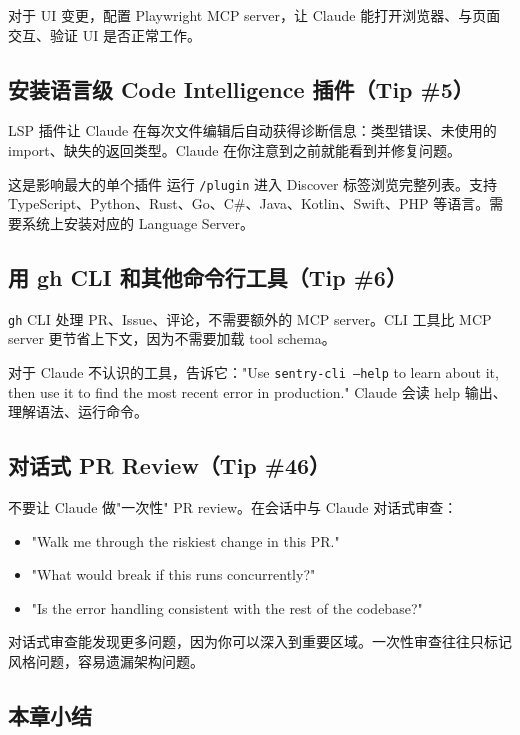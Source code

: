 \documentclass[a4paper]{article}
\begin{document}
对于 UI 变更，配置 Playwright MCP server，让 Claude 能打开浏览器、与页面交互、验证 UI 是否正常工作。

\subsection{安装语言级 Code Intelligence 插件（Tip \#5）}

LSP 插件让 Claude 在每次文件编辑后自动获得诊断信息：类型错误、未使用的 import、缺失的返回类型。Claude 在你注意到之前就能看到并修复问题。

\begin{knowledgebox}{这是影响最大的单个插件}
运行 \texttt{/plugin} 进入 Discover 标签浏览完整列表。支持 TypeScript、Python、Rust、Go、C\#、Java、Kotlin、Swift、PHP 等语言。需要系统上安装对应的 Language Server。
\end{knowledgebox}

\subsection{用 gh CLI 和其他命令行工具（Tip \#6）}

\texttt{gh} CLI 处理 PR、Issue、评论，不需要额外的 MCP server。CLI 工具比 MCP server 更节省上下文，因为不需要加载 tool schema。

对于 Claude 不认识的工具，告诉它："Use \texttt{sentry-cli --help} to learn about it, then use it to find the most recent error in production." Claude 会读 help 输出、理解语法、运行命令。

\subsection{对话式 PR Review（Tip \#46）}

不要让 Claude 做"一次性" PR review。在会话中与 Claude 对话式审查：
\begin{itemize}
  \item "Walk me through the riskiest change in this PR."
  \item "What would break if this runs concurrently?"
  \item "Is the error handling consistent with the rest of the codebase?"
\end{itemize}

对话式审查能发现更多问题，因为你可以深入到重要区域。一次性审查往往只标记风格问题，容易遗漏架构问题。

\subsection{本章小结}
\end{document}
